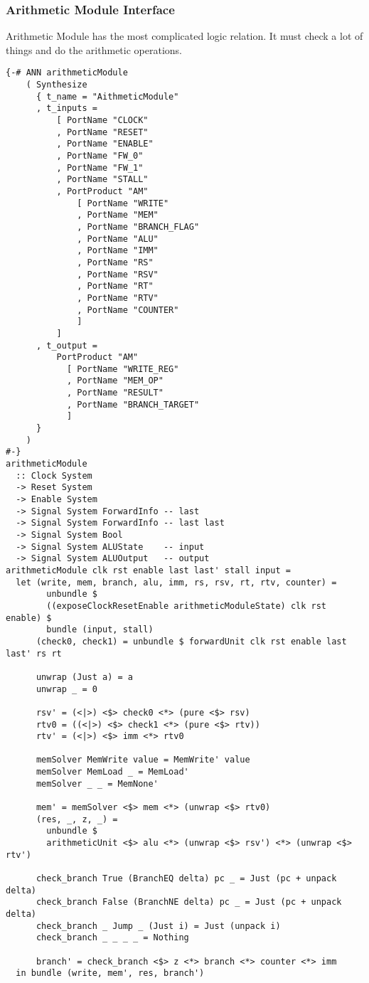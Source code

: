 \subsubsection{Arithmetic Module Interface}
Arithmetic Module has the most complicated logic relation. It must check a lot of things and do the arithmetic operations.
\begin{verbatim}
{-# ANN arithmeticModule
    ( Synthesize
      { t_name = "AithmeticModule"
      , t_inputs =
          [ PortName "CLOCK"
          , PortName "RESET"
          , PortName "ENABLE"
          , PortName "FW_0"
          , PortName "FW_1"
          , PortName "STALL"
          , PortProduct "AM"
              [ PortName "WRITE"
              , PortName "MEM"
              , PortName "BRANCH_FLAG"
              , PortName "ALU"
              , PortName "IMM"
              , PortName "RS"
              , PortName "RSV"
              , PortName "RT"
              , PortName "RTV"
              , PortName "COUNTER"
              ]
          ]
      , t_output =
          PortProduct "AM"
            [ PortName "WRITE_REG"
            , PortName "MEM_OP"
            , PortName "RESULT"
            , PortName "BRANCH_TARGET"
            ]
      }
    )
#-}
arithmeticModule 
  :: Clock System
  -> Reset System
  -> Enable System
  -> Signal System ForwardInfo -- last
  -> Signal System ForwardInfo -- last last
  -> Signal System Bool
  -> Signal System ALUState    -- input
  -> Signal System ALUOutput   -- output
arithmeticModule clk rst enable last last' stall input =
  let (write, mem, branch, alu, imm, rs, rsv, rt, rtv, counter) =
        unbundle $
        ((exposeClockResetEnable arithmeticModuleState) clk rst enable) $
        bundle (input, stall)
      (check0, check1) = unbundle $ forwardUnit clk rst enable last last' rs rt
      
      unwrap (Just a) = a
      unwrap _ = 0
      
      rsv' = (<|>) <$> check0 <*> (pure <$> rsv)
      rtv0 = ((<|>) <$> check1 <*> (pure <$> rtv))
      rtv' = (<|>) <$> imm <*> rtv0
      
      memSolver MemWrite value = MemWrite' value
      memSolver MemLoad _ = MemLoad'
      memSolver _ _ = MemNone'
      
      mem' = memSolver <$> mem <*> (unwrap <$> rtv0)
      (res, _, z, _) =
        unbundle $
        arithmeticUnit <$> alu <*> (unwrap <$> rsv') <*> (unwrap <$> rtv')
      
      check_branch True (BranchEQ delta) pc _ = Just (pc + unpack delta)
      check_branch False (BranchNE delta) pc _ = Just (pc + unpack delta)
      check_branch _ Jump _ (Just i) = Just (unpack i)
      check_branch _ _ _ _ = Nothing
      
      branch' = check_branch <$> z <*> branch <*> counter <*> imm
  in bundle (write, mem', res, branch')
\end{verbatim}
